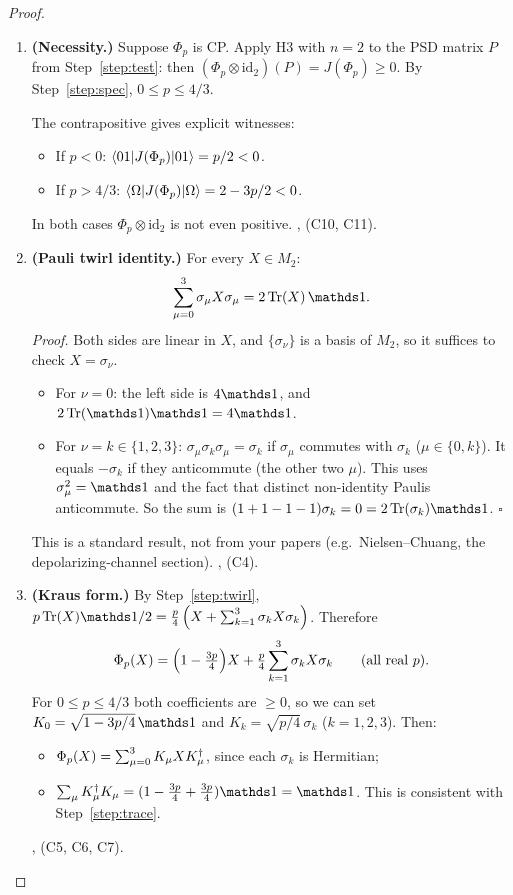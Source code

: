 \documentclass[11pt]{article}
\begin{document}
\begin{proof}
\begin{enumerate}
  \item\label{step:nec} \textbf{(Necessity.)} Suppose $\Phi_p$ is CP. Apply H3 with $n=2$ to
    the PSD matrix $P$ from Step~\ref{step:test}: then
    $(\Phi_p\otimes\mathrm{id}_2)(P)=J(\Phi_p)\ge0$. By Step~\ref{step:spec}, $0\le p\le 4/3$.

    The contrapositive gives explicit witnesses:
    \begin{itemize}
      \item If $p<0$: $\left\langle 01 \middle\vert J(\Phi_p) \middle\vert 01 \right\rangle=p/2<0$.
      \item If $p>4/3$: $\left\langle \Omega \middle\vert J(\Phi_p) \middle\vert \Omega \right\rangle=2-3p/2<0$.
    \end{itemize}
    In both cases $\Phi_p\otimes\mathrm{id}_2$ is not even positive. \own, \computed{} (C10,
    C11).

  \item\label{step:twirl} \textbf{(Pauli twirl identity.)} For every $X\in M_2$:
    \begin{equation}\label{eq:twirl}
      \sum_{\mu=0}^3\sigma_\mu X\sigma_\mu=2\Tr(X)\,\id.
    \end{equation}
    \emph{Proof.} Both sides are linear in $X$, and $\{\sigma_\nu\}$ is a basis of $M_2$, so it
    suffices to check $X=\sigma_\nu$.
    \begin{itemize}
      \item For $\nu=0$: the left side is $4\id$, and $2\Tr(\id)\id=4\id$.
      \item For $\nu=k\in\{1,2,3\}$: $\sigma_\mu\sigma_k\sigma_\mu=\sigma_k$ if $\sigma_\mu$
        commutes with $\sigma_k$ ($\mu\in\{0,k\}$). It equals $-\sigma_k$ if they anticommute
        (the other two $\mu$). This uses $\sigma_\mu^2=\id$ and the fact that distinct
        non-identity Paulis anticommute. So the sum is $(1+1-1-1)\sigma_k=0=2\Tr(\sigma_k)\id$.
        $\square$
    \end{itemize}
    This is a standard result, not from your papers (e.g.\ Nielsen--Chuang, the
    depolarizing-channel section). \own, \computed{} (C4).

  \item\label{step:kraus} \textbf{(Kraus form.)} By Step~\ref{step:twirl},
    $p\Tr(X)\id/2=\tfrac p4\left(X+\sum_{k=1}^3\sigma_kX\sigma_k\right)$. Therefore
    \begin{equation}\label{eq:kraus}
      \Phi_p(X)=\Bigl(1-\tfrac{3p}{4}\Bigr)X+\tfrac p4\sum_{k=1}^3\sigma_kX\sigma_k
      \qquad(\text{all real }p).
    \end{equation}
    For $0\le p\le4/3$ both coefficients are $\ge0$, so we can set $K_0=\sqrt{1-3p/4}\,\id$ and
    $K_k=\sqrt{p/4}\,\sigma_k$ ($k=1,2,3$). Then:
    \begin{itemize}
      \item $\Phi_p(X)=\sum_{\mu=0}^3K_\mu XK_\mu^{\dagger}$, since each $\sigma_k$ is Hermitian;
      \item $\sum_\mu K_\mu\dg K_\mu=(1-\tfrac{3p}{4}+\tfrac{3p}{4})\id=\id$. This is consistent
        with Step~\ref{step:trace}.
    \end{itemize}
    \own, \computed{} (C5, C6, C7).


\end{enumerate}
\end{proof}
\end{document}
